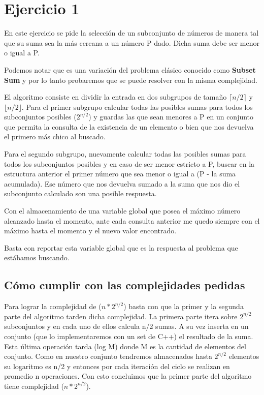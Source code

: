 \section{Ejercicio 1}

En este ejercicio se pide la selección de un subconjunto de números de manera tal que su suma sea la más cercana a un número P dado.
Dicha suma debe ser menor o igual a P.

Podemos notar que es una variación del problema clásico conocido como \textbf{Subset Sum} y por lo tanto probaremos que se puede resolver con la misma complejidad.

El algoritmo consiste en dividir la entrada en dos subgrupos de tamaño $\lceil n/2 \rceil$ y $\lfloor n/2 \rfloor$.
Para el primer subgrupo calcular todas las posibles sumas para todos los subconjuntos posibles ($2^{n/2}$) y guardas las que sean menores a P en un conjunto que permita la consulta de la existencia de un elemento o bien que nos devuelva el primero más chico al buscado.

Para el segundo subgrupo, nuevamente calcular todas las posibles sumas para todos los subconjuntos posibles y en caso de ser menor estricto a P, buscar en la estructura anterior el primer número que sea menor o igual a (P - la suma acumulada). Ese número que nos devuelva sumado a la suma que nos dio el subconjunto calculado son una posible respuesta. 

Con el almacenamiento de una variable global que posea el máximo número alcanzado hasta el momento, ante cada consulta anterior me quedo siempre con el máximo hasta el momento y el nuevo valor encontrado. 

Basta con reportar esta variable global que es la respuesta al problema que estábamos buscando.

\subsection{Cómo cumplir con las complejidades pedidas}

Para lograr la complejidad de \bigo($n * 2 ^{n/2}$) basta con que la primer y la segunda parte del algoritmo tarden dicha complejidad.
La primera parte itera sobre $2 ^{n/2}$ subconjuntos y en cada uno de ellos calcula n/2 sumas. A su vez inserta en un conjunto (que lo implementaremos con un set de C++) el resultado de la suma. Esta última operación tarda \bigo(log M) donde M es la cantidad de elementos del conjunto. Como en nuestro conjunto tendremos almacenados hasta $2 ^{n/2}$ elementos su logaritmo es n/2 y entonces por cada iteración del ciclo se realizan en promedio n operaciones.
Con esto concluimos que la primer parte del algoritmo tiene complejidad  \bigo($n * 2 ^{n/2}$).

